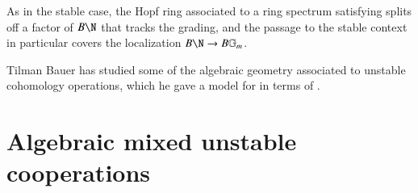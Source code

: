 \begin{remark}
As in the stable case, the Hopf ring associated to a ring spectrum satisfying {\UFH} splits off a factor of $B\N$ that tracks the grading, and the passage to the stable context in particular covers the localization $B\N \to B\Gm$.
\end{remark}

\begin{remark}
Tilman Bauer has studied some of the algebraic geometry associated to unstable cohomology operations, which he gave a model for in terms of .
\end{remark}










\section{Algebraic mixed unstable cooperations}\label{UnstableAlgebraicModelSection}

